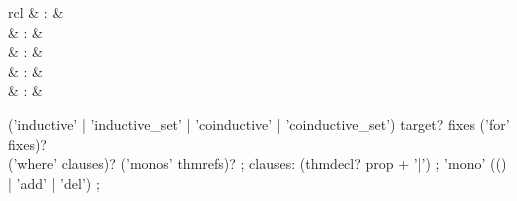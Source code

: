 \begin{isabellebody}
\begin{isamarkuptext}
  \begin{matharray}{rcl}
    \hypertarget{command.HOL.inductive}{\hyperlink{command.HOL.inductive}{\mbox{}}} & : &  \\
    \hypertarget{command.HOL.inductive-set}{\hyperlink{command.HOL.inductive-set}{\mbox{}}} & : &  \\
    \hypertarget{command.HOL.coinductive}{\hyperlink{command.HOL.coinductive}{\mbox{}}} & : &  \\
    \hypertarget{command.HOL.coinductive-set}{\hyperlink{command.HOL.coinductive-set}{\mbox{}}} & : &  \\
    \hypertarget{attribute.HOL.mono}{\hyperlink{attribute.HOL.mono}{\mbox{}}} & : &  \\
  \end{matharray}

  \begin{rail}
    ('inductive' | 'inductive\_set' | 'coinductive' | 'coinductive\_set') target? fixes ('for' fixes)? \\
    ('where' clauses)? ('monos' thmrefs)?
    ;
    clauses: (thmdecl? prop + '|')
    ;
    'mono' (() | 'add' | 'del')
    ;
  \end{rail}

  \begin{description}


\end{description}
\end{isamarkuptext}
\end{isabellebody}
